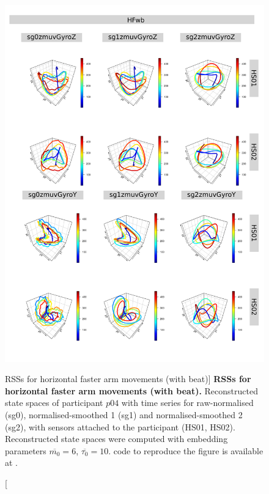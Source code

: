 \begin{figure}
\centering
\includegraphics[height=0.8\textheight]{rss_HFwb_p04}
\caption
	[RSSs for horizontal faster arm movements (with beat)]{
	{\bf RSSs for horizontal faster arm movements (with beat).}
	Reconstructed state spaces of participant $p04$
	with time series for raw-normalised (sg0), 
	normalised-smoothed 1 (sg1) and 
	normalised-smoothed 2 (sg2), 
	with sensors attached to the participant (HS01, HS02).
	Reconstructed state spaces were computed with 
	embedding parameters $\overline{m_0}=6$, $\overline{\tau_0}=10$.
		\R code to reproduce the figure is available at 
		.
        }
     \label{fig:rss_HFwb_p04}
\end{figure}





